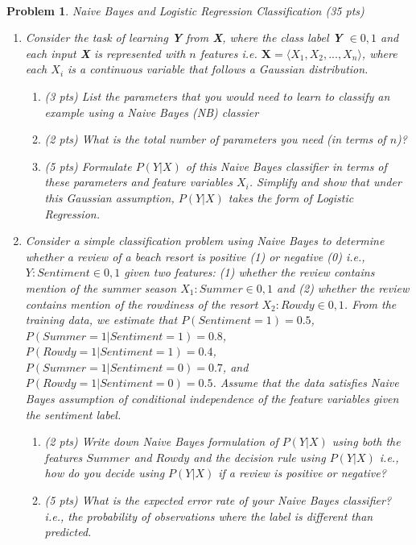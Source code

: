 \documentclass{article}
\newtheorem{problem}{Problem}
\begin{document}
\paragraph{}
\begin{problem} Naive Bayes and Logistic Regression Classification (35 pts)
\begin{enumerate}
\item Consider the task of learning \textbf{Y} from \textbf{X}, where the
class label \textbf{Y} $\in {0, 1}$ and each input \textbf{X} is represented
with $n$ features i.e. $\textbf{X}=\langle X_1, X_2, ..., X_n \rangle$, where
each $X_i$ is a continuous variable that follows a Gaussian distribution.
\begin{enumerate}
\item (3 pts) List the parameters that you would need to learn to classify
an example using a Naive Bayes (NB) classier
\item (2 pts) What is the total number of parameters you need (in terms of
$n$)?
\item (5 pts) Formulate $P(Y|X)$ of this Naive Bayes classifier in terms
of these parameters and feature variables $X_i$. Simplify and show that under
this Gaussian assumption, $P(Y|X)$ takes the form of Logistic Regression.
\end{enumerate}
\item Consider a simple classification problem using Naive Bayes to determine
whether a review of a beach resort is positive (1) or negative (0) i.e.,
$Y: Sentiment \in {0, 1}$ given two features: (1) whether the review contains
mention of the summer season $X_1: Summer \in {0, 1}$ and (2) whether the
review contains mention of the rowdiness of the resort $X_2: Rowdy \in {0,
1}$. From the training data, we estimate that $P(Sentiment=1) = 0.5$, $P(Summer=1|Sentiment=1)
= 0.8$, $P(Rowdy=1|Sentiment=1)=0.4$, $P(Summer=1|Sentiment=0)=0.7$, and
$P(Rowdy=1|Sentiment=0)=0.5$. Assume that the data satisfies Naive Bayes
assumption of conditional independence of the feature variables given the
sentiment label. 
\begin{enumerate}
\item (2 pts) Write down Naive Bayes formulation of $P(Y|X)$ using both the
features $Summer$ and $Rowdy$ and the decision rule using $P(Y|X)$ i.e.,
how do you decide using $P(Y|X)$ if a review is positive or negative?
\item (5 pts) What is the expected error rate of your Naive Bayes classifier?
i.e., the probability of observations where the label is different than predicted.
 

\end{enumerate}
\end{enumerate}
\end{problem}
\end{document}
